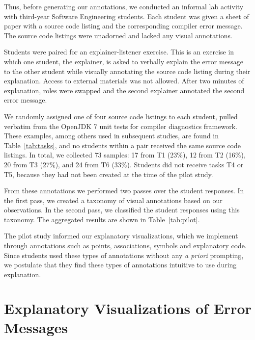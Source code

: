 \documentclass[conference]{IEEEtran}
\begin{document}
Thus, before generating our annotations, we conducted an informal lab activity with third-year Software Engineering students. Each student was given a sheet of paper with a source code listing and the corresponding compiler error message. The source code listings were unadorned and lacked any visual annotations.

Students were paired for an explainer-listener exercise. This is an exercise in which one student, the explainer, is asked to verbally explain the error message to the other student while visually annotating the source code listing during their explanation. Access to external materials was not allowed. After two minutes of explanation, roles were swapped and the second explainer annotated the second error message.

We randomly assigned one of four source code listings to each student, pulled verbatim from the OpenJDK 7 unit tests for compiler diagnostics framework. These examples, among others used in subsequent studies, are found in Table~\ref{tab:tasks}, and no students within a pair received the same source code listings. In total, we collected 73 samples:  17 from T1 (23\%), 12 from T2 (16\%), 20 from T3 (27\%), and 24 from T6 (33\%). Students did not receive tasks T4 or T5, because they had not been created at the time of the pilot study.

From these annotations we performed two passes over the student responses. In the first pass, we created a taxonomy of visual annotations based on our observations. In the second pass, we classified the student responses using this taxonomy. The aggregated results are shown in Table~\ref{tab:pilot}.

The pilot study informed our explanatory visualizations, which we implement through annotations such as points, associations, symbols and explanatory code. Since students used these types of annotations without any \textit{a priori} prompting, we postulate that they find these types of annotations intuitive to use during explanation.

\section{Explanatory Visualizations of Error Messages}
\label{sec:motivation}
\end{document}
